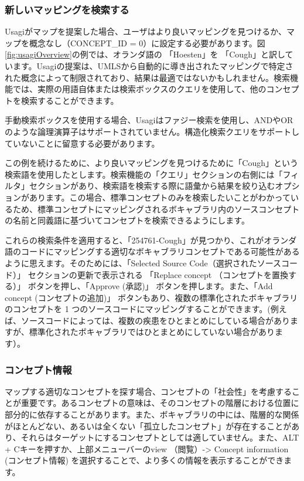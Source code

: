\documentclass[
  11pt]{book}
\theoremstyle{definition}
\theoremstyle{definition}
\theoremstyle{definition}
\theoremstyle{definition}
\theoremstyle{remark}
\begin{document}
\subsubsection*{新しいマッピングを検索する}\label{ux65b0ux3057ux3044ux30deux30c3ux30d4ux30f3ux30b0ux3092ux691cux7d22ux3059ux308b}

Usagiがマップを提案した場合、ユーザはより良いマッピングを見つけるか、マップを概念なし（CONCEPT\_ID = 0）に設定する必要があります。図 \ref{fig:usagiOverview}の例では、オランダ語の 「Hoesten」を 「Cough」と訳しています。Usagiの提案は、UMLSから自動的に導き出されたマッピングで特定された概念によって制限されており、結果は最適ではないかもしれません。検索機能では、実際の用語自体または検索ボックスのクエリを使用して、他のコンセプトを検索することができます。

手動検索ボックスを使用する場合、Usagiはファジー検索を使用し、ANDやORのような論理演算子はサポートされていません。構造化検索クエリをサポートしていないことに留意する必要があります。

この例を続けるために、より良いマッピングを見つけるために「Cough」という検索語を使用したとします。検索機能の「クエリ」セクションの右側には「フィルタ」セクションがあり、検索語を検索する際に語彙から結果を絞り込むオプションがあります。この場合、標準コンセプトのみを検索したいことがわかっているため、標準コンセプトにマッピングされるボキャブラリ内のソースコンセプトの名前と同義語に基づいてコンセプトを検索できるようにします。

これらの検索条件を適用すると、「254761-Cough」が見つかり、これがオランダ語のコードにマッピングする適切なボキャブラリコンセプトである可能性があるように思えます。そのためには、「Selected Source Code（選択されたソースコード）」 セクションの更新で表示される 「Replace concept （コンセプトを置換する）」 ボタンを押し、「Approve (承認)」 ボタンを押します。また、「Add concept (コンセプトの追加)」 ボタンもあり、複数の標準化されたボキャブラリのコンセプトを 1 つのソースコードにマッピングすることができます。(例えば、ソースコードによっては、複数の疾患をひとまとめにしている場合がありますが、標準化されたボキャブラリではひとまとめにしていない場合があります）。

\subsubsection*{コンセプト情報}\label{ux30b3ux30f3ux30bbux30d7ux30c8ux60c5ux5831}

マップする適切なコンセプトを探す場合、コンセプトの「社会性」を考慮することが重要です。あるコンセプトの意味は、そのコンセプトの階層における位置に部分的に依存することがあります。また、ボキャブラリの中には、階層的な関係がほとんどない、あるいは全くない「孤立したコンセプト」が存在することがあり、それらはターゲットにするコンセプトとしては適していません。また、ALT + Cキーを押すか、上部メニューバーのview （閲覧）-\textgreater{} Concept information (コンセプト情報) を選択することで、より多くの情報を表示することができます。
\end{document}
